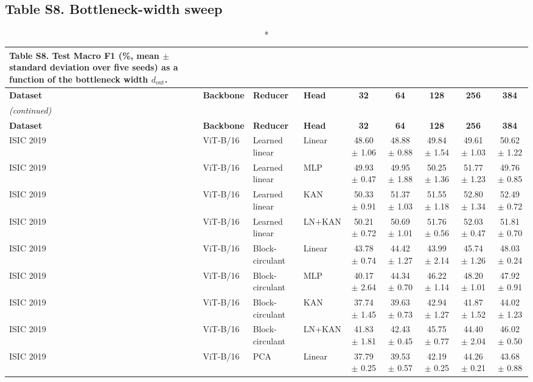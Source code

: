 \documentclass[10pt]{article}
\begin{document}
\subsection*{Table S8. Bottleneck-width sweep}
\scriptsize
\setlength{\tabcolsep}{3pt}
\begin{longtable}{llllccccc}
\caption*{\textbf{Table S8.} Test Macro F1 (\%, mean $\pm$ standard deviation over five seeds) as a function of the bottleneck width $d_{\mathrm{out}}$.}\\
\toprule
\textbf{Dataset} & \textbf{Backbone} & \textbf{Reducer} & \textbf{Head} & \textbf{32} & \textbf{64} & \textbf{128} & \textbf{256} & \textbf{384} \\
\midrule
\endfirsthead
\multicolumn{9}{l}{\textit{(continued)}}\\
\toprule
\textbf{Dataset} & \textbf{Backbone} & \textbf{Reducer} & \textbf{Head} & \textbf{32} & \textbf{64} & \textbf{128} & \textbf{256} & \textbf{384} \\
\midrule
\endhead
\bottomrule
\endfoot
ISIC 2019 & ViT-B/16 & Learned linear & Linear & 48.60 $\pm$ 1.06 & 48.88 $\pm$ 0.88 & 49.84 $\pm$ 1.54 & 49.61 $\pm$ 1.03 & 50.62 $\pm$ 1.22 \\
ISIC 2019 & ViT-B/16 & Learned linear & MLP & 49.93 $\pm$ 0.47 & 49.95 $\pm$ 1.88 & 50.25 $\pm$ 1.36 & 51.77 $\pm$ 1.23 & 49.76 $\pm$ 0.85 \\
ISIC 2019 & ViT-B/16 & Learned linear & KAN & 50.33 $\pm$ 0.91 & 51.37 $\pm$ 1.03 & 51.55 $\pm$ 1.18 & 52.80 $\pm$ 1.34 & 52.49 $\pm$ 0.72 \\
ISIC 2019 & ViT-B/16 & Learned linear & LN+KAN & 50.21 $\pm$ 0.72 & 50.69 $\pm$ 1.01 & 51.76 $\pm$ 0.56 & 52.03 $\pm$ 0.47 & 51.81 $\pm$ 0.70 \\
ISIC 2019 & ViT-B/16 & Block-circulant & Linear & 43.78 $\pm$ 0.74 & 44.42 $\pm$ 1.27 & 43.99 $\pm$ 2.14 & 45.74 $\pm$ 1.26 & 48.03 $\pm$ 0.24 \\
ISIC 2019 & ViT-B/16 & Block-circulant & MLP & 40.17 $\pm$ 2.64 & 44.34 $\pm$ 0.70 & 46.22 $\pm$ 1.14 & 48.20 $\pm$ 1.01 & 47.92 $\pm$ 0.91 \\
ISIC 2019 & ViT-B/16 & Block-circulant & KAN & 37.74 $\pm$ 1.45 & 39.63 $\pm$ 0.73 & 42.94 $\pm$ 1.27 & 41.87 $\pm$ 1.52 & 44.02 $\pm$ 1.23 \\
ISIC 2019 & ViT-B/16 & Block-circulant & LN+KAN & 41.83 $\pm$ 1.81 & 42.43 $\pm$ 0.45 & 45.75 $\pm$ 0.77 & 44.40 $\pm$ 2.04 & 46.02 $\pm$ 0.50 \\
ISIC 2019 & ViT-B/16 & PCA & Linear & 37.79 $\pm$ 0.25 & 39.53 $\pm$ 0.57 & 42.19 $\pm$ 0.25 & 44.26 $\pm$ 0.21 & 43.68 $\pm$ 0.88 \\

\end{longtable}
\end{document}
